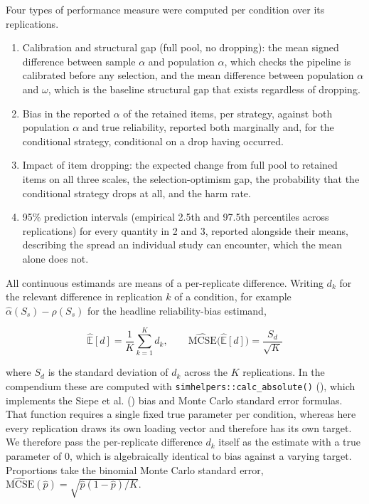 \documentclass[
  nonatbib,
  authoryear,
  preprint]{elsarticle}
\providecommand{\tightlist}{%
  \setlength{\itemsep}{0pt}\setlength{\parskip}{0pt}}
\begin{document}
Four types of performance measure were computed per condition over its
replications.

\begin{enumerate}
\def\labelenumi{\arabic{enumi}.}
\tightlist
\item
  Calibration and structural gap (full pool, no dropping): the mean
  signed difference between sample \(\alpha\) and population \(\alpha\),
  which checks the pipeline is calibrated before any selection, and the
  mean difference between population \(\alpha\) and \(\omega\), which is
  the baseline structural gap that exists regardless of dropping.
\item
  Bias in the reported \(\alpha\) of the retained items, per strategy,
  against both population \(\alpha\) and true reliability, reported both
  marginally and, for the conditional strategy, conditional on a drop
  having occurred.
\item
  Impact of item dropping: the expected change from full pool to
  retained items on all three scales, the selection-optimism gap, the
  probability that the conditional strategy drops at all, and the harm
  rate.
\item
  95\% prediction intervals (empirical 2.5th and 97.5th percentiles
  across replications) for every quantity in 2 and 3, reported alongside
  their means, describing the spread an individual study can encounter,
  which the mean alone does not.
\end{enumerate}

All continuous estimands are means of a per-replicate difference.
Writing \(d_k\) for the relevant difference in replication \(k\) of a
condition, for example \(\hat\alpha(S_s) - \rho(S_s)\) for the headline
reliability-bias estimand,

\[\widehat{\mathbb{E}}[d] = \frac{1}{K}\sum_{k=1}^{K} d_k, \qquad
\widehat{\text{MCSE}}\big(\widehat{\mathbb{E}}[d]\big) = \frac{S_{d}}{\sqrt K}\]

where \(S_d\) is the standard deviation of \(d_k\) across the \(K\)
replications. In the compendium these are computed with
\texttt{simhelpers::calc\_absolute()}
(),
which implements the Siepe et al.
() bias and Monte Carlo
standard error formulas. That function requires a single fixed true
parameter per condition, whereas here every replication draws its own
loading vector and therefore has its own target. We therefore pass the
per-replicate difference \(d_k\) itself as the estimate with a true
parameter of 0, which is algebraically identical to bias against a
varying target. Proportions take the binomial Monte Carlo standard
error,
\(\widehat{\text{MCSE}}(\hat p) = \sqrt{\hat p (1 - \hat p) / K}\).
\end{document}
